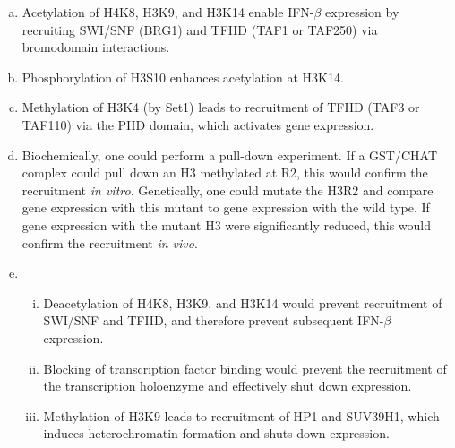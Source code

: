 \documentclass[a4paper, 10pt]{article}
\begin{document}
\hspace{15px}
\vspace{450px}

\begin{enumerate}[a)]

  \item Acetylation of H4K8, H3K9, and H3K14 enable IFN-$\beta$ expression by recruiting SWI/SNF (BRG1) and TFIID (TAF1 or TAF250) via bromodomain interactions.
  \item Phosphorylation of H3S10 enhances acetylation at H3K14.
  \item Methylation of H3K4 (by Set1) leads to recruitment of TFIID (TAF3 or TAF110) via the PHD domain, which activates gene expression.
  \item Biochemically, one could perform a pull-down experiment. If a GST/CHAT complex could pull down an H3 methylated at R2, this would confirm the recruitment \textit{in vitro}. Genetically, one could mutate the H3R2 and compare gene expression with this mutant to gene expression with the wild type. If gene expression with the mutant H3 were significantly reduced, this would confirm the recruitment \textit{in vivo}.
  \item \begin{enumerate}[i.]
    \item Deacetylation of H4K8, H3K9, and H3K14 would prevent recruitment of SWI/SNF and TFIID, and therefore prevent subsequent IFN-$\beta$ expression.
    \item Blocking of transcription factor binding would prevent the recruitment of the transcription holoenzyme and effectively shut down expression.
    \item Methylation of H3K9 leads to recruitment of HP1 and SUV39H1, which induces heterochromatin formation and shuts down expression.
  \end{enumerate}

\end{enumerate}
\end{document}
